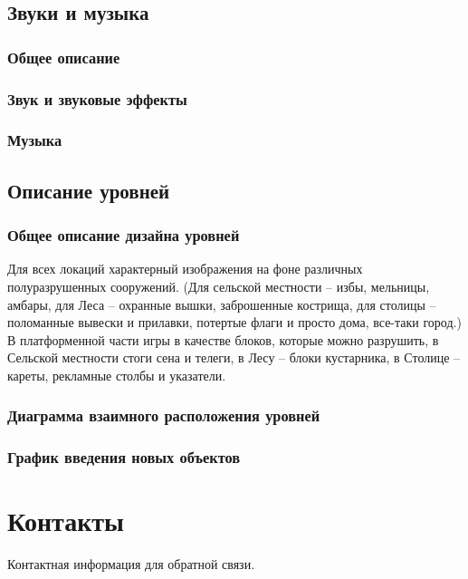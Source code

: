 \documentclass{article}
\begin{document}
\subsection{Звуки и музыка}
\subsubsection{Общее описание}


\subsubsection{Звук и звуковые эффекты}


\subsubsection{Музыка}


\subsection{Описание уровней}
\subsubsection{Общее описание дизайна уровней}
Для всех локаций характерный изображения на фоне различных полуразрушенных сооружений.
(Для сельской местности – избы, мельницы, амбары, для Леса – охранные вышки, заброшенные кострища, для столицы – поломанные вывески и прилавки, потертые флаги и просто дома, все-таки город.)
В платформенной части игры в качестве блоков, которые можно разрушить, в Сельской местности стоги сена и телеги, в Лесу – блоки кустарника, в Столице – кареты, рекламные столбы и указатели.

\subsubsection{Диаграмма взаимного расположения уровней}


\subsubsection{График введения новых объектов}


\newpage

\section{Контакты}
Контактная информация для обратной связи.
\end{document}
